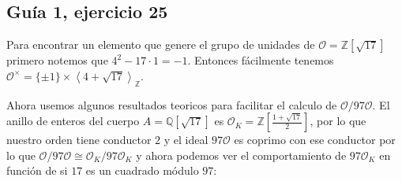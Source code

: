 \documentclass[12pt]{amsart}
\DeclareMathOperator{\mcd}{mcd}
\newcommand{\QQ}{\mathbb{Q}}
\newcommand{\ZZ}{\mathbb{Z}}
\newcommand{\OO}{\mathcal{O}}
\newcommand{\lc}{\left<}
\newcommand{\rc}{\right>}
\theoremstyle{plain}
\begin{document}


















\subsection*{Guía 1, ejercicio 25}

Para encontrar un elemento que genere el grupo de unidades de
$\OO=\ZZ[\sqrt{17}]$ primero notemos que $4^2-17\cdot 1=-1$. 
Entonces fácilmente tenemos $\OO^\times = \{\pm 1\} \times 
\lc4+\sqrt{17}\rc_\ZZ$. 

Ahora usemos algunos resultados teoricos para facilitar el calculo de 
$\OO / 97\OO$. El anillo de enteros del cuerpo $A=\QQ[\sqrt{17}]$ es 
$\OO_K = \ZZ[\frac{1+\sqrt{17}}{2}]$, por lo que nuestro
orden tiene conductor $2$ y el ideal $97\OO$ es coprimo con ese conductor
por lo que $\OO /97\OO \cong \OO_K / 97 \OO_K$
y ahora podemos ver el comportamiento de $97\OO_K$
en función de si $17$ es un cuadrado módulo $97$:
\end{document}

